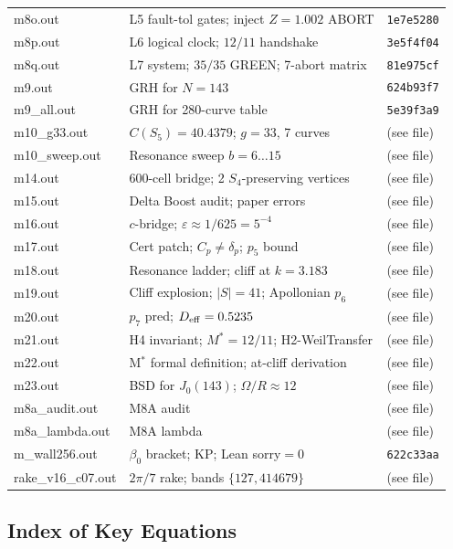 \documentclass[12pt,letterpaper]{article}
\begin{document}
\begin{center}
\begin{longtable}{lll}
m8o.out & L5 fault-tol gates; inject $Z=1.002$ ABORT & \texttt{1e7e5280} \\
m8p.out & L6 logical clock; $12/11$ handshake & \texttt{3e5f4f04} \\
m8q.out & L7 system; $35/35$ GREEN; 7-abort matrix & \texttt{81e975cf} \\
m9.out & GRH for $N=143$ & \texttt{624b93f7} \\
m9\_all.out & GRH for 280-curve table & \texttt{5e39f3a9} \\
m10\_g33.out & $C(S_5)=40.4379$; $g=33$, 7 curves & (see file) \\
m10\_sweep.out & Resonance sweep $b=6\ldots15$ & (see file) \\
m14.out & 600-cell bridge; 2 $S_4$-preserving vertices & (see file) \\
m15.out & Delta Boost audit; paper errors & (see file) \\
m16.out & $c$-bridge; $\varepsilon \approx 1/625 = 5^{-4}$ & (see file) \\
m17.out & Cert patch; $C_p \neq \delta_p$; $p_5$ bound & (see file) \\
m18.out & Resonance ladder; cliff at $k=3.183$ & (see file) \\
m19.out & Cliff explosion; $|S|=41$; Apollonian $p_6$ & (see file) \\
m20.out & $p_7$ pred; $D_{\rm eff}=0.5235$ & (see file) \\
m21.out & H4 invariant; $M^*=12/11$; H2-WeilTransfer & (see file) \\
m22.out & M$^*$ formal definition; at-cliff derivation & (see file) \\
m23.out & BSD for $J_0(143)$; $\Omega/R \approx 12$ & (see file) \\
m8a\_audit.out & M8A audit & (see file) \\
m8a\_lambda.out & M8A lambda & (see file) \\
m\_wall256.out & $\beta_0$ bracket; KP; Lean sorry$=0$ & \texttt{622c33aa} \\
rake\_v16\_c07.out & $2\pi/7$ rake; bands $\{127, 414679\}$ & (see file) \\
\bottomrule
\end{longtable}
\end{center}

\subsection{Index of Key Equations}
\end{document}
